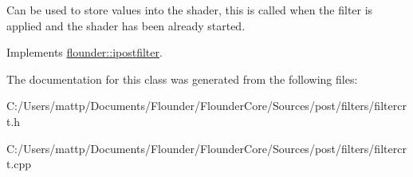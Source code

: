 Can be used to store values into the shader, this is called when the filter is applied and the shader has been already started. 



Implements \hyperlink{classflounder_1_1ipostfilter_a9b658b4672718d5ac36539875bde722e}{flounder\+::ipostfilter}.



The documentation for this class was generated from the following files\+:\begin{DoxyCompactItemize}
\item 
C\+:/\+Users/mattp/\+Documents/\+Flounder/\+Flounder\+Core/\+Sources/post/filters/filtercrt.\+h\item 
C\+:/\+Users/mattp/\+Documents/\+Flounder/\+Flounder\+Core/\+Sources/post/filters/filtercrt.\+cpp\end{DoxyCompactItemize}
